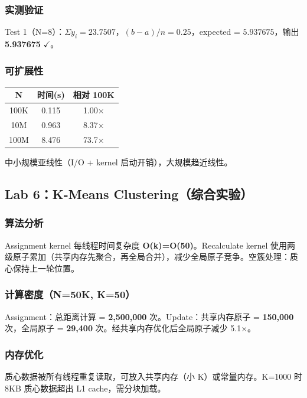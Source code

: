 \documentclass[12pt,a4paper]{article}
\newcommand{\ans}[1]{\textcolor{answerblue}{\textbf{#1}}}
\begin{document}
\subsubsection*{实测验证}
Test 1（N=8）：$\Sigma y_i=23.7507$，$(b-a)/n=0.25$，expected = $5.937675$，输出 \ans{5.937675} $\checkmark$。

\subsubsection*{可扩展性}
\begin{table}[H]
\centering
\begin{tabular}{ccc}
\toprule
N & 时间(s) & 相对 100K \\
\midrule
100K     & 0.115  & 1.00$\times$ \\
10M      & 0.963  & 8.37$\times$ \\
100M     & 8.476  & 73.7$\times$ \\
\bottomrule
\end{tabular}
\end{table}
中小规模亚线性（I/O + kernel 启动开销），大规模趋近线性。

\subsection{Lab 6：K-Means Clustering（综合实验）}

\subsubsection*{算法分析}
Assignment kernel 每线程时间复杂度 \ans{O(k)=O(50)}。Recalculate kernel 使用两级原子累加（共享内存先聚合，再全局合并），减少全局原子竞争。空簇处理：质心保持上一轮位置。

\subsubsection*{计算密度（N=50K, K=50）}
Assignment：总距离计算 = \ans{2,500,000} 次。Update：共享内存原子 = \ans{150,000} 次，全局原子 = \ans{29,400} 次。经共享内存优化后全局原子减少 5.1$\times$。

\subsubsection*{内存优化}
质心数据被所有线程重复读取，可放入共享内存（小 K）或常量内存。K=1000 时 8KB 质心数据超出 L1 cache，需分块加载。
\end{document}
